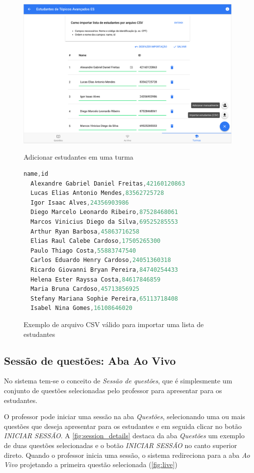 \begin{figure}[ht]
  \centering
  \caption{Adicionar estudantes em uma turma}
  \includegraphics[scale=.4]{imagens/telas/add_students}
  \doautor
  \label{fig:add_students}
\end{figure}

\begin{figure}[ht]
\caption{Exemplo de arquivo CSV válido para importar uma lista de estudantes}
\begin{lstlisting}[language=JavaScript]
  name,id
  Alexandre Gabriel Daniel Freitas,42160120863
  Lucas Elias Antonio Mendes,83562725728
  Igor Isaac Alves,24356903986
  Diego Marcelo Leonardo Ribeiro,87528468061
  Marcos Vinicius Diego da Silva,69525285553
  Arthur Ryan Barbosa,45863716258
  Elias Raul Calebe Cardoso,17505265300
  Paulo Thiago Costa,55883747540
  Carlos Eduardo Henry Cardoso,24051360318
  Ricardo Giovanni Bryan Pereira,84740254433
  Helena Ester Rayssa Costa,84617846859
  Maria Bruna Cardoso,45713856925
  Stefany Mariana Sophie Pereira,65113718408
  Isabel Nina Gomes,16108646020
\end{lstlisting}
  \doautor
\label{fig:import_csv}
\end{figure}

\subsection{Sessão de questões: Aba Ao Vivo}

No sistema tem-se o conceito de \textit{Sessão de questões}, que é
simplesmente um conjunto de questões selecionadas pelo professor
para apresentar para os estudantes.

O professor pode iniciar uma sessão na aba \textit{Questões}, selecionando
uma ou mais questões que deseja apresentar para os estudantes e
em seguida clicar no botão \textit{INICIAR SESSÃO}. A \autoref{fig:session_details}
destaca da aba \textit{Questões} um exemplo de duas questões selecionadas e o botão
\textit{INICIAR SESSÃO} no canto superior direto. Quando o professor inicia uma sessão,
o sistema redireciona para a aba \textit{Ao Vivo} projetando a primeira questão selecionada (\autoref{fig:live})

